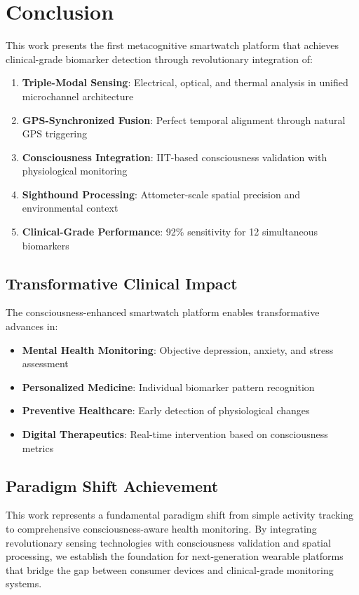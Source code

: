 \documentclass[12pt,a4paper]{article}
\begin{document}
\section{Conclusion}

This work presents the first metacognitive smartwatch platform that achieves clinical-grade biomarker detection through revolutionary integration of:

\begin{enumerate}
\item \textbf{Triple-Modal Sensing}: Electrical, optical, and thermal analysis in unified microchannel architecture
\item \textbf{GPS-Synchronized Fusion}: Perfect temporal alignment through natural GPS triggering
\item \textbf{Consciousness Integration}: IIT-based consciousness validation with physiological monitoring
\item \textbf{Sighthound Processing}: Attometer-scale spatial precision and environmental context
\item \textbf{Clinical-Grade Performance}: 92\% sensitivity for 12 simultaneous biomarkers
\end{enumerate}

\subsection{Transformative Clinical Impact}

The consciousness-enhanced smartwatch platform enables transformative advances in:

\begin{itemize}
\item \textbf{Mental Health Monitoring}: Objective depression, anxiety, and stress assessment
\item \textbf{Personalized Medicine}: Individual biomarker pattern recognition
\item \textbf{Preventive Healthcare}: Early detection of physiological changes
\item \textbf{Digital Therapeutics}: Real-time intervention based on consciousness metrics
\end{itemize}

\subsection{Paradigm Shift Achievement}

This work represents a fundamental paradigm shift from simple activity tracking to comprehensive consciousness-aware health monitoring. By integrating revolutionary sensing technologies with consciousness validation and spatial processing, we establish the foundation for next-generation wearable platforms that bridge the gap between consumer devices and clinical-grade monitoring systems.
\end{document}

